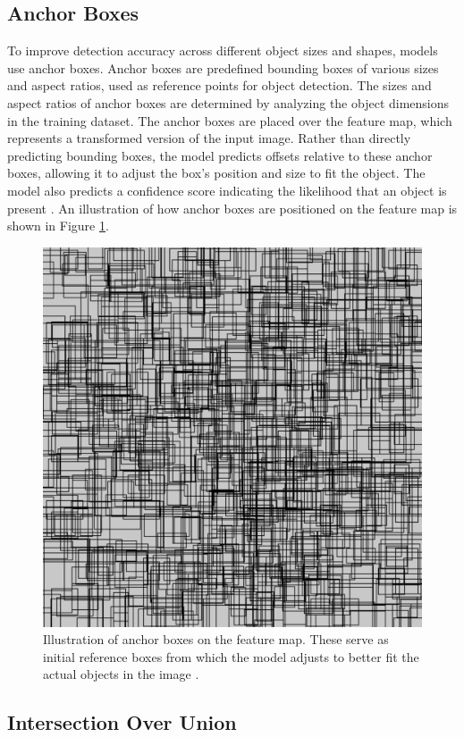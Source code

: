 \newpage

\subsection{Anchor Boxes}

To improve detection accuracy across different object sizes and shapes, models use anchor boxes. Anchor boxes are predefined bounding boxes of various sizes and aspect ratios, used as reference points for object detection. The sizes and aspect ratios of anchor boxes are determined by analyzing the object dimensions in the training dataset. The anchor boxes are placed over the feature map, which represents a transformed version of the input image. Rather than directly predicting bounding boxes, the model predicts offsets relative to these anchor boxes, allowing it to adjust the box's position and size to fit the object. The model also predicts a confidence score indicating the likelihood that an object is present \cite{thinkautonomous:anchorboxes}. An illustration of how anchor boxes are positioned on the feature map is shown in Figure \ref{fig:anchor-box}.

\begin{figure}[h!]
    \centering
    \includegraphics[width=0.56\linewidth]{figures/theory/image-recognition/anchor-boxes.png}
    \caption[Anchor boxes in object detection]{Illustration of anchor boxes on the feature map. These serve as initial reference boxes from which the model adjusts to better fit the actual objects in the image \cite{thinkautonomous:anchorboxes}.}
    \label{fig:anchor-box}
\end{figure}

\newpage

\subsection{Intersection Over Union}

